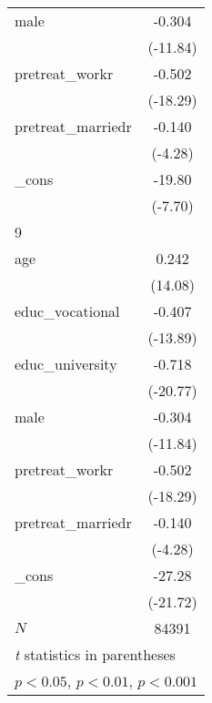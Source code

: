 {\begin{tabular}{l*{1}{c}}
male        &      -0.304\sym{***}\\
            &    (-11.84)         \\
[1em]
pretreat\_workr&      -0.502\sym{***}\\
            &    (-18.29)         \\
[1em]
pretreat\_marriedr&      -0.140\sym{***}\\
            &     (-4.28)         \\
[1em]
\_cons      &      -19.80\sym{***}\\
            &     (-7.70)         \\
\hline
9           &                     \\
age         &       0.242\sym{***}\\
            &     (14.08)         \\
[1em]
educ\_vocational&      -0.407\sym{***}\\
            &    (-13.89)         \\
[1em]
educ\_university&      -0.718\sym{***}\\
            &    (-20.77)         \\
[1em]
male        &      -0.304\sym{***}\\
            &    (-11.84)         \\
[1em]
pretreat\_workr&      -0.502\sym{***}\\
            &    (-18.29)         \\
[1em]
pretreat\_marriedr&      -0.140\sym{***}\\
            &     (-4.28)         \\
[1em]
\_cons      &      -27.28\sym{***}\\
            &    (-21.72)         \\
\hline
\(N\)       &       84391         \\
\hline\hline
\multicolumn{2}{l}{\footnotesize \textit{t} statistics in parentheses}\\
\multicolumn{2}{l}{\footnotesize \sym{*} \(p<0.05\), \sym{**} \(p<0.01\), \sym{***} \(p<0.001\)}\\
\end{tabular}
}
